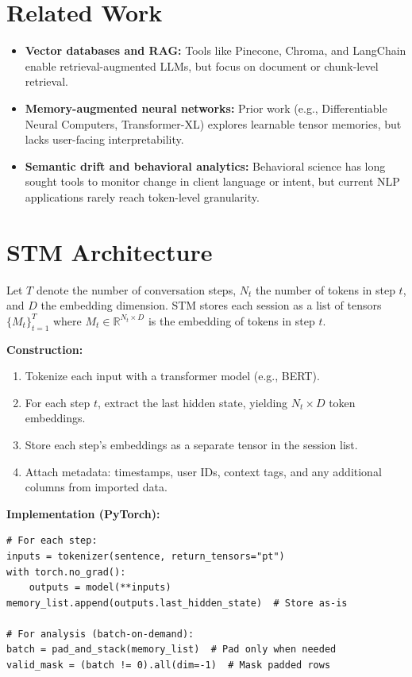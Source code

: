 \documentclass[11pt]{article}
\begin{document}
\section{Related Work}
\begin{itemize}[leftmargin=2em]
    \item \textbf{Vector databases and RAG:} Tools like Pinecone, Chroma, and LangChain enable retrieval-augmented LLMs, but focus on document or chunk-level retrieval.
    \item \textbf{Memory-augmented neural networks:} Prior work (e.g., Differentiable Neural Computers, Transformer-XL) explores learnable tensor memories, but lacks user-facing interpretability.
    \item \textbf{Semantic drift and behavioral analytics:} Behavioral science has long sought tools to monitor change in client language or intent, but current NLP applications rarely reach token-level granularity.
\end{itemize}

\section{STM Architecture}
Let $T$ denote the number of conversation steps, $N_t$ the number of tokens in step $t$, and $D$ the embedding dimension. STM stores each session as a list of tensors $\{M_t\}_{t=1}^T$ where $M_t \in \mathbb{R}^{N_t \times D}$ is the embedding of tokens in step $t$.

\vspace{0.5em}
\textbf{Construction:}
\begin{enumerate}[leftmargin=2em]
    \item Tokenize each input with a transformer model (e.g., BERT).
    \item For each step $t$, extract the last hidden state, yielding $N_t \times D$ token embeddings.
    \item Store each step's embeddings as a separate tensor in the session list.
    \item Attach metadata: timestamps, user IDs, context tags, and any additional columns from imported data.
\end{enumerate}

\vspace{0.5em}
\textbf{Implementation (PyTorch):}
\begin{verbatim}
# For each step:
inputs = tokenizer(sentence, return_tensors="pt")
with torch.no_grad():
    outputs = model(**inputs)
memory_list.append(outputs.last_hidden_state)  # Store as-is

# For analysis (batch-on-demand):
batch = pad_and_stack(memory_list)  # Pad only when needed
valid_mask = (batch != 0).all(dim=-1)  # Mask padded rows
\end{verbatim}
\end{document}
